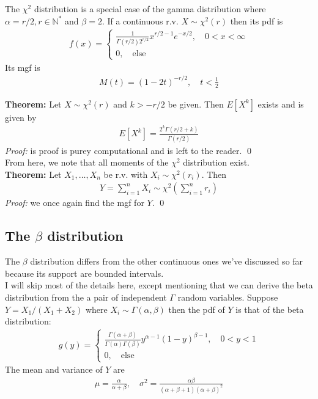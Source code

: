 \documentclass{book}
\theoremstyle{definition}
\newcommand{\al}{\alpha}
\newcommand{\be}{\beta}
\newcommand{\f}[2]{\frac{#1}{#2}}
\newcommand{\lp}{\left(}
\newcommand{\rp}{\right)}
\begin{document}
The $\chi^2$ distribution is a special case of the gamma distribution where $\alpha = r/2, r \in \mathbb{N}^*$ and $\beta = 2$. If a continuous r.v. $X \sim \chi^2(r)$ then its pdf is 
\begin{align}
\boxed{f(x) = \begin{cases}
\f{1}{\Gamma(r/2)2^{r/2}} x^{r/2-1}e^{-x/2}, \quad 0 < x < \infty\\
0, \quad \text{else}
\end{cases}}
\end{align}
Its mgf is 
\begin{align}
\boxed{M(t) = (1-2t)^{-r/2}, \quad t < \f{1}{2}}
\end{align}

\noindent\textbf{Theorem:} Let $X \sim \chi^2(r)$ and $k > -r/2$ be given. Then $ E[X^k] $ exists and is given by
\begin{align}
\boxed{E[X^k] = \f{2^k\Gamma\lp r/2 + k \rp}{\Gamma(r/2)}}
\end{align}
\noindent \textit{Proof:} is proof is purey computational and is left to the reader. \qed\\

From here, we note that all moments of the $\chi^2$ distribution exist.\\

\noindent\textbf{Theorem:} Let $X_1, \dots, X_n$ be r.v. with $X_i \sim \chi^2(r_i)$. Then
\begin{align}
\boxed{Y = \sum^n_{i=1}X_i \sim \chi^2\lp \sum^n_{i=1}r_i \rp}
\end{align}
\noindent \textit{Proof:} we once again find the mgf for $Y$. \qed\\


\subsection{The $\beta$ distribution}

The $\beta$ distribution differs from the other continuous ones we've discussed so far because its support are bounded intervals. \\

I will skip most of the details here, except mentioning that we can derive the beta distribution from the a pair of independent $\Gamma$ random variables. Suppose $Y = X_1/(X_1 + X_2)$ where $X_i \sim \Gamma(\alpha, \beta)$ then the pdf of $Y$ is that of the beta distribution:
\begin{align}
\boxed{g(y) = \begin{cases}
	\f{\Gamma(\alpha+\beta)}{\Gamma(\alpha)\Gamma(\beta)}y^{\alpha-1}(1-y)^{\beta-1},\quad 0< y< 1\\
	0,\quad \text{else}
	\end{cases}}
\end{align} 
The mean and variance of $Y$ are
\begin{align}
\boxed{\mu = \f{\alpha}{\alpha+ \beta}, \quad \sigma^2 = \f{\alpha\beta}{(\al + \be + 1)(\al + \be)^2}}
\end{align}
\end{document}
